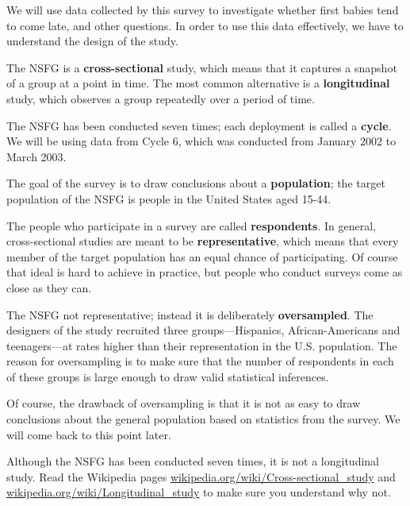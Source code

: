 \documentclass[10pt]{book}
\begin{document}
We will use data collected by this survey to investigate whether first
babies tend to come late, and other questions.  In order to use this
data effectively, we have to understand the design of the study.

The NSFG is a {\bf cross-sectional} study, which means that it
captures a snapshot of a group at a point in time.  The most
common alternative is a {\bf longitudinal} study, which observes a
group repeatedly over a period of time.

The NSFG has been conducted seven times; each deployment is called
a {\bf cycle}.  We will be using data from Cycle 6, which was
conducted from January 2002 to March 2003.

The goal of the survey is to draw conclusions about a
{\bf population}; the target population of the NSFG is people in
the United States aged 15-44.

The people who participate in a survey are called {\bf respondents}.
In general, cross-sectional studies are meant to be {\bf
  representative}, which means that every member of the target
population has an equal chance of participating.  Of course that ideal
is hard to achieve in practice, but people who conduct surveys come as
close as they can.

The NSFG not representative; instead it is deliberately {\bf
  oversampled}.  The designers of the study recruited three
groups---Hispanics, African-Americans and teenagers---at rates higher
than their representation in the U.S. population.
The reason for oversampling is to make sure that the number of
respondents in each of these groups is large enough to draw valid
statistical inferences.

Of course, the drawback of oversampling is that it is not as easy
to draw conclusions about the general population based on statistics
from the survey.  We will come back to this point later.

\begin{ex}

Although the NSFG has been conducted seven times, it is not a
longitudinal study.  Read the Wikipedia pages
\url{wikipedia.org/wiki/Cross-sectional_study}
and
\url{wikipedia.org/wiki/Longitudinal_study}
to make sure you understand why not.

\end{ex}
\end{document}
